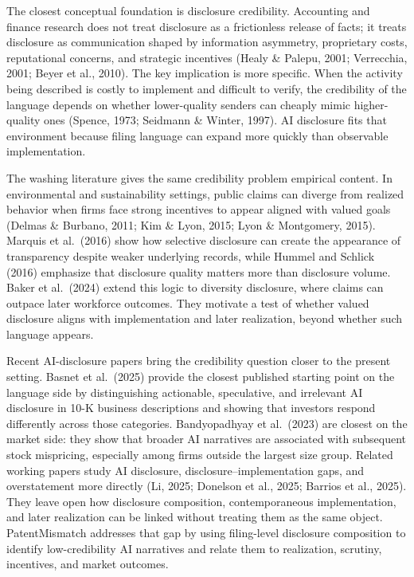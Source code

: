 The closest conceptual foundation is disclosure credibility. Accounting and finance research does not treat disclosure as a frictionless release of facts; it treats disclosure as communication shaped by information asymmetry, proprietary costs, reputational concerns, and strategic incentives (Healy \& Palepu, 2001; Verrecchia, 2001; Beyer et al., 2010). The key implication is more specific. When the activity being described is costly to implement and difficult to verify, the credibility of the language depends on whether lower-quality senders can cheaply mimic higher-quality ones (Spence, 1973; Seidmann \& Winter, 1997). AI disclosure fits that environment because filing language can expand more quickly than observable implementation.

The washing literature gives the same credibility problem empirical content. In environmental and sustainability settings, public claims can diverge from realized behavior when firms face strong incentives to appear aligned with valued goals (Delmas \& Burbano, 2011; Kim \& Lyon, 2015; Lyon \& Montgomery, 2015). Marquis et al.~(2016) show how selective disclosure can create the appearance of transparency despite weaker underlying records, while Hummel and Schlick (2016) emphasize that disclosure quality matters more than disclosure volume. Baker et al.~(2024) extend this logic to diversity disclosure, where claims can outpace later workforce outcomes. They motivate a test of whether valued disclosure aligns with implementation and later realization, beyond whether such language appears.

Recent AI-disclosure papers bring the credibility question closer to the present setting. Basnet et al.~(2025) provide the closest published starting point on the language side by distinguishing actionable, speculative, and irrelevant AI disclosure in 10-K business descriptions and showing that investors respond differently across those categories. Bandyopadhyay et al.~(2023) are closest on the market side: they show that broader AI narratives are associated with subsequent stock mispricing, especially among firms outside the largest size group. Related working papers study AI disclosure, disclosure--implementation gaps, and overstatement more directly (Li, 2025; Donelson et al., 2025; Barrios et al., 2025). They leave open how disclosure composition, contemporaneous implementation, and later realization can be linked without treating them as the same object. PatentMismatch addresses that gap by using filing-level disclosure composition to identify low-credibility AI narratives and relate them to realization, scrutiny, incentives, and market outcomes.

